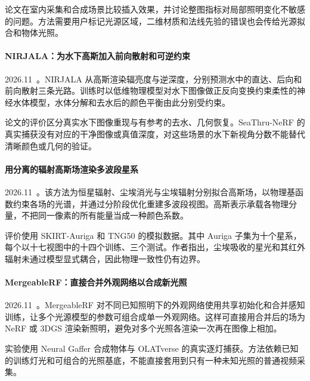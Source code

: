 论文在室内采集和合成场景比较插入效果，并讨论整图指标对局部照明变化不敏感的问题。方法需要用户标记光源区域，二维材质和法线先验的错误也会传给光源拟合和物体光照。

\paragraph{NIRJALA：为水下高斯加入前向散射和可逆约束}
2026.11~\cite{2611_23450}。NIRJALA 从高斯渲染辐亮度与逆深度，分别预测水中的直达、后向和前向散射三条光路。训练时以低维物理模型对水下图像做正反向变换约束柔性的神经水体模型，水体分解和去水后的颜色平衡由此分别受约束。

论文的评价区分真实水下图像重现与有参考的去水、几何恢复。SeaThru-NeRF 的真实捕获没有对应的干净图像或真值深度，对这些场景的水下新视角分数不能替代清晰颜色或几何的验证。

\paragraph{用分离的辐射高斯场渲染多波段星系}
2026.11~\cite{2611_24723}。该方法为恒星辐射、尘埃消光与尘埃辐射分别拟合高斯场，以物理基函数约束各场的光谱，并通过分阶段优化重建多波段视图。高斯表示承载各物理分量，不把同一像素的所有能量当成一种颜色系数。

评价使用 SKIRT-Auriga 和 TNG50 的模拟数据。其中 Auriga 子集为十个星系，每个以十七视图中的十四个训练、三个测试。作者指出，尘埃吸收的星光和其红外辐射未通过模型显式耦合，因此物理一致性仍有边界。

\paragraph{MergeableRF：直接合并外观网络以合成新光照}
2026.11~\cite{2611_25523}。MergeableRF 对不同已知照明下的外观网络使用共享初始化和合并感知训练，让多个光源模型的参数可组合成单一外观网络。这样可直接用合并后的场为 NeRF 或 3DGS 渲染新照明，避免对多个光照各渲染一次再在图像上相加。

实验使用 Neural Gaffer 合成物体与 OLATverse 的真实逐灯捕获。方法依赖已知的训练灯光和可组合的光照基底，不能直接套用到只有一种未知光照的普通视频采集。
